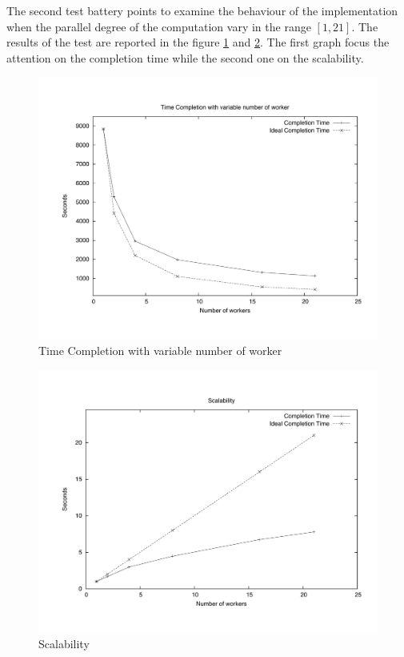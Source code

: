 The second test battery points to examine the behaviour of the implementation when the parallel degree of the computation vary in the range $[1, 21]$. The results of the test are reported in the figure \ref{NTime}  and \ref{NScal}. The first graph focus the attention on the completion time while the second one on the scalability.


\begin{figure}[th]
	\centerline{
		\mbox{\includegraphics[scale=0.48]{HadoopTest/PsFiles/NTime.pdf}}
	}
	\caption{Time Completion with variable number of worker} 
        \label{NTime}
\end{figure}

\begin{figure}[th]
	\centerline{
		\mbox{\includegraphics[scale=0.48]{HadoopTest/PsFiles/NScal.pdf}}
	}
	\caption{Scalability} 
        \label{NScal}
\end{figure}

